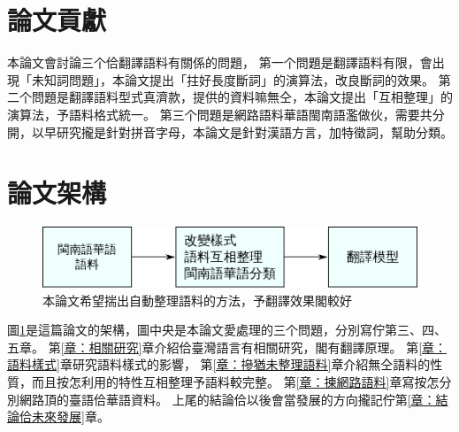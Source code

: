 \section{論文貢獻}
\label{節：論文貢獻}
本論文會討論三个佮翻譯語料有關係的問題，
第一个問題是翻譯語料有限，會出現「未知詞問題」，本論文提出「拄好長度斷詞」的演算法，改良斷詞的效果。
第二个問題是翻譯語料型式真濟款，提供的資料嘛無仝，本論文提出「互相整理」的演算法，予語料格式統一。%
第三个問題是網路語料華語閩南語濫做伙，需要共分開，以早研究攏是針對拼音字母，本論文是針對漢語方言，加特徵詞，幫助分類。

\section{論文架構}
\label{節：論文架構}

\begin{figure}
\centerline{\includegraphics[keepaspectratio]{圖/規个論文}}
\caption{本論文希望揣出自動整理語料的方法，予翻譯效果閣較好}
\label{圖：規个論文架構}
\end{figure}
圖\ref{圖：規个論文架構}是這篇論文的架構，圖中央是本論文愛處理的三个問題，分別寫佇第三、四、五章。
第\ref{章：相關研究}章介紹佮臺灣語言有相關研究，閣有翻譯原理。
第\ref{章：語料樣式}章研究語料樣式的影響，
第\ref{章：摻猶未整理語料}章介紹無仝語料的性質，而且按怎利用的特性互相整理予語料較完整。
第\ref{章：揀網路語料}章寫按怎分別網路頂的臺語佮華語資料。
上尾的結論佮以後會當發展的方向攏記佇第\ref{章：結論佮未來發展}章。
